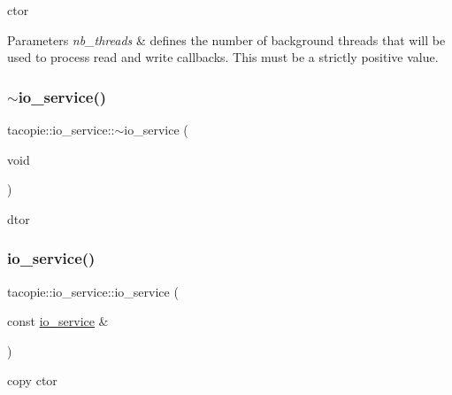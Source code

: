 ctor


\begin{DoxyParams}{Parameters}
{\em nb\+\_\+threads} & defines the number of background threads that will be used to process read and write callbacks. This must be a strictly positive value. \\
\hline
\end{DoxyParams}
\mbox{\label{classtacopie_1_1io__service_ae423d7e4b13f07fe41fb051345ffbf8d}} 
\subsubsection{\texorpdfstring{$\sim$io\+\_\+service()}{~io\_service()}}
{\footnotesize\ttfamily tacopie\+::io\+\_\+service\+::$\sim$io\+\_\+service (\begin{DoxyParamCaption}\item[{void}]{ }\end{DoxyParamCaption})}



dtor 

\mbox{\label{classtacopie_1_1io__service_ad5da7503d8fec083c6d28455ec9e21c7}} 
\subsubsection{\texorpdfstring{io\+\_\+service()}{io\_service()}\hspace{0.1cm}{\footnotesize\ttfamily [2/2]}}
{\footnotesize\ttfamily tacopie\+::io\+\_\+service\+::io\+\_\+service (\begin{DoxyParamCaption}\item[{const \hyperlink{classtacopie_1_1io__service}{io\+\_\+service} \&}]{ }\end{DoxyParamCaption})\hspace{0.3cm}{\ttfamily [delete]}}



copy ctor 




